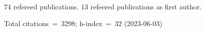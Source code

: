 74 refereed publications. 13 refeered publications as first author.

Total citations~=~3298; h-index~=~32 (2023-06-03)